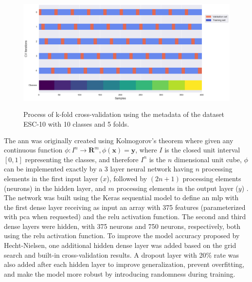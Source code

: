 \begin{figure}[htbp]
    \raggedright
        \caption{Process of k-fold cross-validation using the metadata of the dataset ESC-10 with 10 classes and 5 folds.}
        \includegraphics[width=1\textwidth]{resources/images/050-methods/Methods_training_k-fold.png}
        \label{fig:methods_training_k-fold}
\end{figure}

The \gls{ann} was originally created using Kolmogorov's theorem where given any continuous function
$\phi: I^n \longrightarrow \mathbf{R}^m, \phi(\mathbf{x})=\mathbf{y}$, where $I$ is the closed unit interval $[0,1]$ representing the classes, and therefore $I^n$ is the $n$ dimensional unit cube, $\phi$ can be implemented exactly by a 3 layer neural network having $n$ processing elements in the first input layer ($x$), followed by $(2 n+1)$ processing elements (neurons) in the hidden layer, and $m$ processing elements in the output layer ($y$) \cite{Hecht-Nielsen1987}. The network was built using the Keras sequential model to define an \gls{mlp} with the first dense layer receiving as input an array with 375 features (parameterized with \gls{pca} when requested) and the \gls{relu} activation function. The second and third dense layers were hidden, with 375 neurons and 750 neurons, respectively, both using the \gls{relu} activation function. To improve the model accuracy proposed by Hecht-Nielsen, one additional hidden dense layer was added based on the grid search and built-in cross-validation results. A dropout layer with 20\% rate was also added after each hidden layer to improve generalization, prevent overfitting, and make the model more robust by introducing randomness during training.

